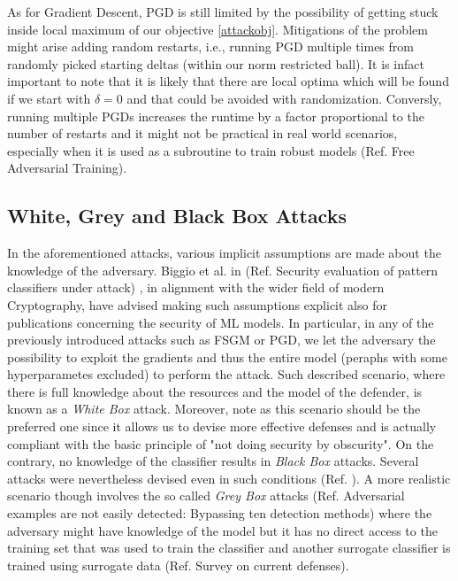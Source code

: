 \documentclass[LaM,binding=0.6cm]{./packages/sapthesis/sapthesis}
\begin{document}
        As for Gradient Descent, PGD is still limited by the possibility of getting stuck inside local maximum of our objective \ref{attackobj}.
        Mitigations of the problem might arise adding random restarts, i.e., running PGD multiple times from randomly picked starting deltas (within our norm restricted ball).
        It is infact important to note that it is likely that there are local optima which will be found if we start with $\delta = 0$ and that could be avoided with randomization. 
        Conversly, running multiple PGDs increases the runtime by a factor proportional to the number of restarts and it might not be practical in real world scenarios, especially when it is used
        as a subroutine to train robust models (Ref. Free Adversarial Training).

    \subsection{White, Grey and Black Box Attacks}

        In the aforementioned attacks, various implicit assumptions are made about the knowledge of the adversary. Biggio et al. in (Ref. Security evaluation of pattern classifiers under attack)
        , in alignment with the wider field of modern Cryptography, have advised making such assumptions explicit also for publications concerning the security of ML models. In particular,
        in any of the previously introduced attacks such as FSGM or PGD, we let the adversary the possibility to exploit the gradients and thus the entire model (peraphs with some hyperparametes excluded) 
        to perform the attack. Such described scenario, where there is full knowledge about the resources and the model of the defender, is known as a \textit{White Box} attack. 
        Moreover, note as this scenario should be the preferred one since it allows us to devise more effective defenses and is actually compliant with the basic principle
        of "not doing security by obscurity".    
        On the contrary, no knowledge of the classifier results in \textit{Black Box} attacks. Several attacks were nevertheless devised even in such conditions (Ref. ). A more realistic 
        scenario though involves the so called \textit{Grey Box} attacks (Ref. Adversarial examples are not easily detected: Bypassing ten detection methods)
        where the adversary might have knowledge of the model but it has no direct access to the training set that
        was used to train the classifier and another surrogate classifier is trained using surrogate data (Ref. Survey on current defenses).
\end{document}

